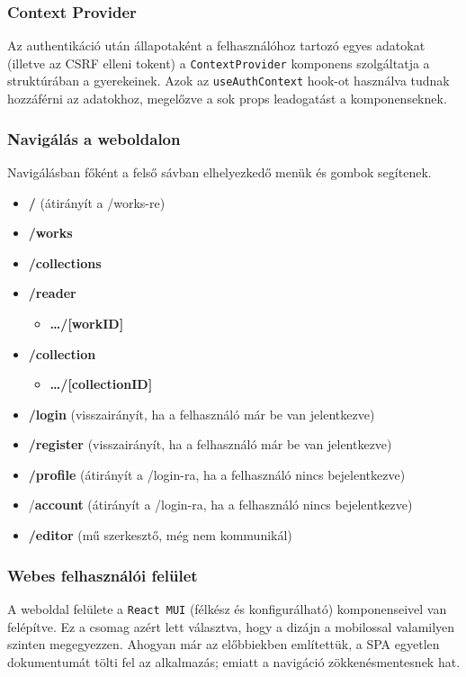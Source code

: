 \subsubsection{Context Provider}
Az authentikáció után állapotaként a felhasználóhoz tartozó egyes adatokat (illetve az CSRF elleni tokent) a \texttt{ContextProvider} komponens szolgáltatja a struktúrában a gyerekeinek.
Azok az \texttt{useAuthContext} hook-ot használva tudnak hozzáférni az adatokhoz, megelőzve a sok props leadogatást a komponenseknek.

\subsubsection{Navigálás a weboldalon}
Navigálásban főként a felső sávban elhelyezkedő menük és gombok segítenek.
\begin{itemize}
    \item \textbf{/} (átirányít a /works-re)
    \item \textbf{/works}
    \item \textbf{/collections}
    \item \textbf{/reader}
    \begin{itemize}
        \item \textbf{\dots/[workID]}
    \end{itemize}
    \item \textbf{/collection}
    \begin{itemize}
        \item \textbf{\dots/[collectionID]}
    \end{itemize}
    \item \textbf{/login} (visszairányít, ha a felhasználó már be van jelentkezve)
    \item \textbf{/register} (visszairányít, ha a felhasználó már be van jelentkezve)
    \item \textbf{/profile} (átirányít a /login-ra, ha a felhasználó nincs bejelentkezve)
    \item /\textbf{account} (átirányít a /login-ra, ha a felhasználó nincs bejelentkezve)
    \item \textbf{/editor} (mű szerkesztő, még nem kommunikál)
\end{itemize}

\subsubsection{Webes felhasználói felület}
A weboldal felülete a \texttt{React MUI} (félkész és konfigurálható) komponenseivel van felépítve.
Ez a csomag azért lett választva, hogy a dizájn a mobilossal valamilyen szinten megegyezzen.
Ahogyan már az előbbiekben említettük, a SPA egyetlen dokumentumát tölti fel az alkalmazás;
emiatt a navigáció zökkenésmentesnek hat.

